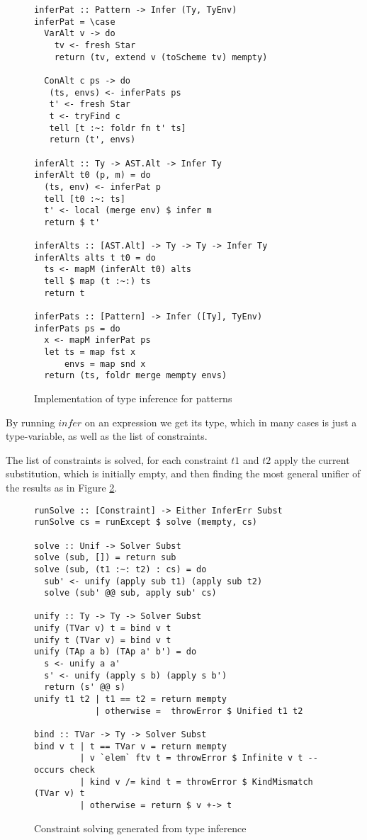 \documentclass[a4paper, openany]{article}
\begin{document}
\begin{figure}[h!]
\begin{lstlisting}
inferPat :: Pattern -> Infer (Ty, TyEnv)
inferPat = \case
  VarAlt v -> do
    tv <- fresh Star
    return (tv, extend v (toScheme tv) mempty)

  ConAlt c ps -> do
   (ts, envs) <- inferPats ps
   t' <- fresh Star
   t <- tryFind c
   tell [t :~: foldr fn t' ts]
   return (t', envs)

inferAlt :: Ty -> AST.Alt -> Infer Ty
inferAlt t0 (p, m) = do
  (ts, env) <- inferPat p
  tell [t0 :~: ts]
  t' <- local (merge env) $ infer m
  return $ t'

inferAlts :: [AST.Alt] -> Ty -> Ty -> Infer Ty
inferAlts alts t t0 = do
  ts <- mapM (inferAlt t0) alts
  tell $ map (t :~:) ts
  return t

inferPats :: [Pattern] -> Infer ([Ty], TyEnv)
inferPats ps = do
  x <- mapM inferPat ps
  let ts = map fst x
      envs = map snd x
  return (ts, foldr merge mempty envs)
\end{lstlisting}
\caption{Implementation of type inference for patterns}
\label{fig:tyinferpat}
\end{figure}

By running \(infer\) on an expression we get its type, which in many cases is just a type-variable, as well as the list of constraints.

The list of constraints is solved, for each constraint \(t1\) and \(t2\) apply the current substitution, which is initially empty, and then finding the most general unifier of the results as in Figure \ref{fig:constraint}.


\begin{figure}[h!]
\begin{lstlisting}
runSolve :: [Constraint] -> Either InferErr Subst
runSolve cs = runExcept $ solve (mempty, cs)

solve :: Unif -> Solver Subst
solve (sub, []) = return sub
solve (sub, (t1 :~: t2) : cs) = do
  sub' <- unify (apply sub t1) (apply sub t2)
  solve (sub' @@ sub, apply sub' cs)

unify :: Ty -> Ty -> Solver Subst
unify (TVar v) t = bind v t
unify t (TVar v) = bind v t
unify (TAp a b) (TAp a' b') = do
  s <- unify a a'
  s' <- unify (apply s b) (apply s b')
  return (s' @@ s)
unify t1 t2 | t1 == t2 = return mempty
            | otherwise =  throwError $ Unified t1 t2

bind :: TVar -> Ty -> Solver Subst
bind v t | t == TVar v = return mempty
         | v `elem` ftv t = throwError $ Infinite v t -- occurs check
         | kind v /= kind t = throwError $ KindMismatch (TVar v) t
         | otherwise = return $ v +-> t
\end{lstlisting}
\caption{Constraint solving generated from type inference}
\label{fig:constraint}
\end{figure}
\end{document}
